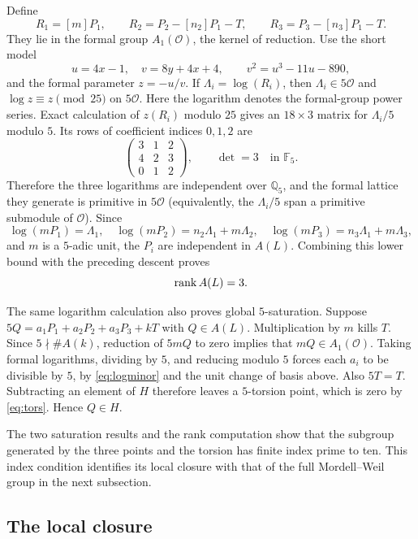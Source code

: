 \documentclass[11pt,a4paper]{article}
\theoremstyle{definition}\newtheorem{definition}[theorem]{Definition}
\theoremstyle{remark}\newtheorem{remark}[theorem]{Remark}
\newcommand{\Q}{\mathbb Q}\newcommand{\Z}{\mathbb Z}\newcommand{\F}{\mathbb F}
\newcommand{\OO}{\mathcal O}\newcommand{\Cl}{\operatorname{Cl}}
\begin{document}
Define
\[
R_1=[m]P_1,\qquad R_2=P_2-[n_2]P_1-T,\qquad
R_3=P_3-[n_3]P_1-T.
\]
They lie in the formal group $A_1(\OO)$, the kernel of reduction.
Use the short model
\[
u=4x-1,\quad v=8y+4x+4,\qquad v^2=u^3-11u-890,
\]
and the formal parameter $z=-u/v$. If $\Lambda_i=\log(R_i)$, then
$\Lambda_i\in5\OO$ and $\log z\equiv z\pmod{25}$ on $5\OO$. Here the logarithm denotes the formal-group power series.
Exact calculation of $z(R_i)$ modulo $25$ gives an $18\times3$ matrix
for $\Lambda_i/5$ modulo $5$. Its rows of coefficient indices $0,1,2$
are
\begin{equation}\label{eq:logminor}
\begin{pmatrix}3&1&2\\4&2&3\\0&1&2\end{pmatrix},
\qquad\det=3\quad\text{in }\F_5.
\end{equation}
Therefore the three logarithms are independent over $\Q_5$, and the
formal lattice they generate is primitive in $5\OO$ (equivalently,
the $\Lambda_i/5$ span a primitive submodule of $\OO$). Since
\[
\log(mP_1)=\Lambda_1,
\quad\log(mP_2)=n_2\Lambda_1+m\Lambda_2,
\quad\log(mP_3)=n_3\Lambda_1+m\Lambda_3,
\]
and $m$ is a $5$-adic unit, the $P_i$ are independent in $A(L)$.
Combining this lower bound with the preceding descent proves
\begin{equation}\label{eq:rank3}
\operatorname{rank} A(L)=3.
\end{equation}

The same logarithm calculation also proves global $5$-saturation. Suppose
$5Q=a_1P_1+a_2P_2+a_3P_3+kT$ with $Q\in A(L)$.
Multiplication by $m$ kills $T$. Since $5\nmid\#A(k)$, reduction of
$5mQ$ to zero implies that $mQ\in A_1(\OO)$. Taking formal logarithms,
dividing by $5$, and reducing modulo $5$ forces each $a_i$ to be
divisible by $5$, by \eqref{eq:logminor} and the unit change of basis
above. Also $5T=T$. Subtracting an element of $H$ therefore leaves a
$5$-torsion point, which is zero by \eqref{eq:tors}. Hence $Q\in H$.

The two saturation results and the rank computation show that the subgroup generated by the three points and the torsion has finite index prime to ten. This index condition identifies its local closure with that of the full Mordell--Weil group in the next subsection.

\subsection{The local closure}
\end{document}
